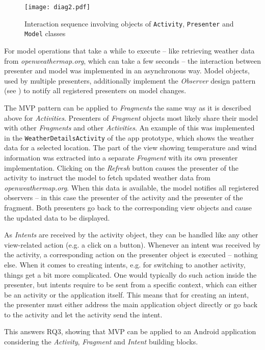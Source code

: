 \begin{figure}[h]
\centering
\texttt{[image: diag2.pdf]}
\caption{Interaction sequence involving objects of \texttt{Activity}, \texttt{Presenter} and \texttt{Model} classes}
\label{fig:androidmvpseq}
\end{figure}

For model operations that take a while to execute -- like retrieving weather data from \emph{openweathermap.org}, which can take a few seconds -- the interaction between presenter and model was implemented in an asynchronous way. Model objects, used by multiple presenters, additionally implement the \emph{Observer} design pattern (see \cite[p. 287]{GangOfFour}) to notify all registered presenters on model changes.

The MVP pattern can be applied to \emph{Fragments} the same way as it is described above for \emph{Activities}. Presenters of \emph{Fragment} objects most likely share their model with other \emph{Fragments} and other \emph{Activities}. An example of this was implemented in the \texttt{WeatherDetailsActivity} of the app prototype, which shows the weather data for a selected location. The part of the view showing temperature and wind information was extracted into a separate \emph{Fragment} with its own presenter implementation. Clicking on the \emph{Refresh} button causes the presenter of the activity to instruct the model to fetch updated weather data from \emph{openweathermap.org}. When this data is available, the model notifies all registered observers -- in this case the presenter of the activity and the presenter of the fragment. Both presenters go back to the corresponding view objects and cause the updated data to be displayed.

As \emph{Intents} are received by the activity object, they can be handled like any other view-related action (e.g. a click on a button). Whenever an intent was received by the activity, a corresponding action on the presenter object is executed -- nothing else. When it comes to creating intents, e.g. for switching to another activity, things get a bit more complicated. One would typically do such action inside the presenter, but intents require to be sent from a specific context, which can either be an activity or the application itself. This means that for creating an intent, the presenter must either address the main application object directly or go back to the activity and let the activity send the intent.

This answers RQ3, showing that MVP can be applied to an Android application considering the \emph{Activity}, \emph{Fragment} and \emph{Intent} building blocks.

